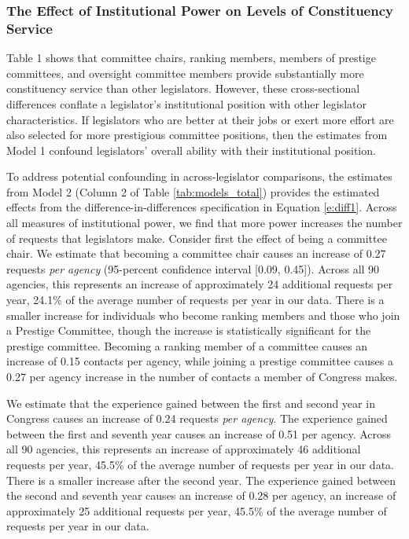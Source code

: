\documentclass[12pt]{article}
\begin{document}
\subsubsection{The Effect of Institutional Power on Levels of Constituency Service}\label{s:prestigeresults} 

Table 1 shows that committee chairs, ranking members, members of prestige committees, and oversight committee members provide substantially more constituency service than other legislators. However, these cross-sectional differences conflate a legislator's institutional position with other legislator characteristics. If legislators who are better at their jobs or exert more effort are also selected for more prestigious committee positions, then the estimates from Model 1 confound legislators' overall ability with their institutional position.   


To address potential confounding in across-legislator comparisons, the estimates from Model 2 (Column 2 of Table \ref{tab:models_total}) provides the estimated effects from the difference-in-differences specification in Equation \ref{e:diff1}. Across all measures of institutional power, we find that more power increases the number of requests that legislators make. Consider first the effect of being a committee chair. We estimate that becoming a committee chair causes an increase of 0.27 requests \textit{per agency} (95-percent confidence interval [0.09, 0.45]). Across all 90 agencies, this represents an increase of approximately 24 additional requests per year, 24.1\% of the average number of requests per year in our data. There is a smaller increase for individuals who become ranking members and those who join a Prestige Committee, though the increase is statistically significant for the prestige committee. Becoming a ranking member of a committee causes an increase of 0.15 contacts per agency, while joining a prestige committee causes a 0.27 per agency increase in the number of contacts a member of Congress makes.

We estimate that the experience gained between the first and second year in Congress causes an increase of 0.24 requests \textit{per agency}. The experience gained between the first and seventh year causes an increase of 0.51 per agency. Across all 90 agencies, this represents an increase of approximately 46 additional requests per year, 45.5\% of the average number of requests per year in our data. There is a smaller increase after the second year. The experience gained between the second and seventh year causes an increase of 0.28 per agency, an increase of approximately 25 additional requests per year, 45.5\% of the average number of requests per year in our data.
\end{document}
